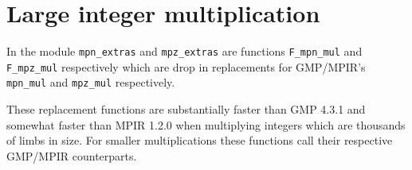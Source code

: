 \documentclass[a4paper,10pt]{article}
\newcommand{\code}{\lstinline}
\begin{document}
\section{Large integer multiplication}
In the module \code{mpn_extras} and \code{mpz_extras} are functions \code{F_mpn_mul} and \code{F_mpz_mul} respectively which are drop in replacements for GMP/MPIR's \code{mpn_mul} and \code{mpz_mul} respectively. 

These replacement functions are substantially faster than GMP 4.3.1 and somewhat faster than MPIR 1.2.0 when multiplying integers which are thousands of limbs in size. For smaller multiplications these functions call their respective GMP/MPIR counterparts.



\end{document}
